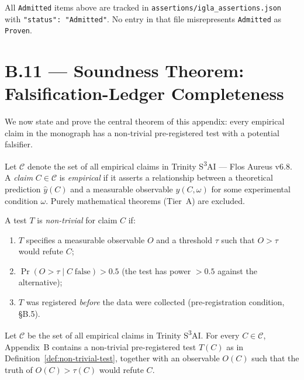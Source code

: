 \noindent All \texttt{Admitted} items above are tracked in
\texttt{assertions/igla\_assertions.json} with \texttt{"status": "Admitted"}.
No entry in that file misrepresents \texttt{Admitted} as \texttt{Proven}.

\section*{B.11 — Soundness Theorem: Falsification-Ledger Completeness}
\label{sec:soundness-theorem}

\noindent We now state and prove the central theorem of this appendix:
every empirical claim in the monograph has a non-trivial pre-registered
test with a potential falsifier.

\begin{definition}\label{def:empirical-claim}
Let $\mathcal{C}$ denote the set of all empirical claims in Trinity
S\textsuperscript{3}AI — Flos Aureus v6.8.  A \emph{claim}
$C \in \mathcal{C}$ is \emph{empirical} if it asserts a relationship
between a theoretical prediction $\hat{y}(C)$ and a measurable observable
$y(C, \omega)$ for some experimental condition $\omega$.  Purely mathematical
theorems (Tier~A) are excluded.
\end{definition}

\begin{definition}\label{def:non-trivial-test}
A test $T$ is \emph{non-trivial} for claim $C$ if:
\begin{enumerate}
  \item[\textup{(i)}] $T$ specifies a measurable observable $O$ and a
    threshold $\tau$ such that $O > \tau$ would refute $C$;
  \item[\textup{(ii)}] $\Pr(O > \tau \mid C\;\text{false}) > 0.5$
    (the test has power $> 0.5$ against the alternative);
  \item[\textup{(iii)}] $T$ was registered \emph{before} the data were
    collected (pre-registration condition, §B.5).
\end{enumerate}
\end{definition}

\begin{theorem}\label{thm:ledger-soundness}
Let $\mathcal{C}$ be the set of all empirical claims in
Trinity S\textsuperscript{3}AI.  For every $C \in \mathcal{C}$, Appendix~B
contains a non-trivial pre-registered test $T(C)$ as in
Definition~\textup{\ref{def:non-trivial-test}}, together with an observable
$O(C)$ such that the truth of $O(C) > \tau(C)$ would refute $C$.
\end{theorem}

